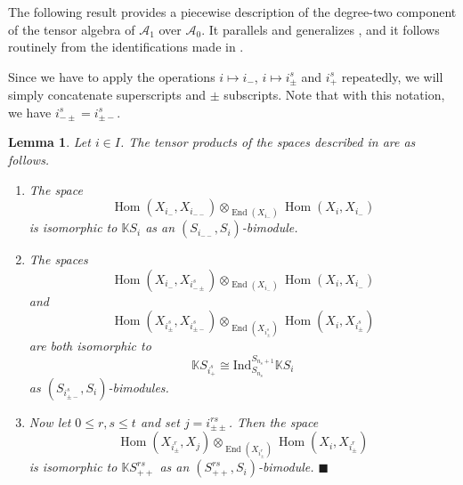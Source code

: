 \documentclass[11pt]{article}
\renewcommand{\labelenumi}{(\arabic{enumi})}
\theoremstyle{plain}
\newtheorem{lemma}{Lemma}[section]
\theoremstyle{nonumberplain}
\theoremstyle{plain}
\theoremstyle{nonumberplain}
\newcommand\bK{\mathbb K}
\newcommand\cA{\mathcal A}
\DeclareMathOperator{\End}{\mathrm{End}}
\DeclareMathOperator{\Hom}{\mathrm{Hom}}
\newcommand{\qedhere}{\mbox{}\hfill\ensuremath{\blacksquare}}
\begin{document}
The following result provides a piecewise description of the
degree-two component of the tensor algebra of $\cA_1$ over $\cA_0$. It
parallels and generalizes \cite[Lemma 3.25]{us2}, and it follows
routinely from the identifications made in
.


Since we have to apply the operations $i\mapsto i_-$,
$i\mapsto i^s_{\pm}$ and $i^s_+$ repeatedly, we will simply
concatenate superscripts and $\pm$ subscripts. Note that with this
notation, we have $i^s_{-\pm}=i^s_{\pm -}$.




\begin{lemma}\label{le.deg-2}
  Let $i\in I$. The tensor products of the
  spaces described in  are as follows.
  \begin{enumerate}
        \renewcommand{\labelenumi}{(\alph{enumi})}
      \item The space
        \begin{equation}
          \label{eq:1}
          \Hom(X_{i_-},X_{i_{--}})\otimes_{\End(X_{i_-})}\Hom(X_i,X_{i_-})
        \end{equation}
        is isomorphic to $\bK S_i$ as an $(S_{i_{--}},S_i)$-bimodule.
      \item The spaces
        \begin{equation}
          \label{eq:2}
          \Hom(X_{i_-},X_{i^s_{-\pm}})\otimes_{\End(X_{i_-})}\Hom(X_i,X_{i_-})
        \end{equation}
        and
        \begin{equation}
          \label{eq:3}
          \Hom(X_{i^s_{\pm}},X_{i^s_{\pm-}})\otimes_{\End(X_{i^s_{\pm}})}\Hom(X_i,X_{i^s_{\pm}})
        \end{equation}
        are both isomorphic to
        \begin{equation*}
          \bK S_{i^s_+} \cong \mathrm{Ind}_{S_{n_s}}^{S_{n_s+1}}\bK S_i
        \end{equation*}
        as $(S_{i^s_{\pm-}},S_i)$-bimodules.
      \item Now let $0\le r, s\le t$ and set $j=i^{rs}_{\pm\pm}$. Then the space
        \begin{equation}
          \label{eq:4}
          \Hom(X_{i^r_{\pm}},X_j)\otimes_{\End(X_{i^r_{\pm}})}\Hom(X_i,X_{i^r_{\pm}})
        \end{equation}
        is isomorphic to $\bK S^{rs}_{++}$ as an $(S^{rs}_{++},S_i)$-bimodule.
        \qedhere
  \end{enumerate}
\end{lemma}
\end{document}
